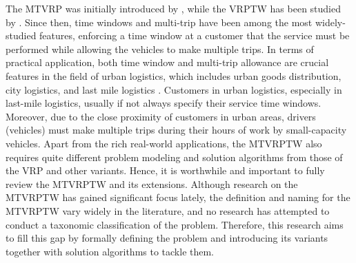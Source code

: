 The MTVRP was initially introduced by \cite{fleischmann1990vehicle}, while the VRPTW has been studied by \cite{kolen1987vehicle}. Since then, time windows and multi-trip have been among the most widely-studied features, enforcing a time window at a customer that the service must be performed while allowing the vehicles to make multiple trips.  In terms of practical application, both time window and multi-trip allowance are crucial features in the field of urban logistics, which includes urban goods distribution, city logistics, and last mile logistics \citep{cardenas2017city}.  Customers in urban logistics, especially in last-mile logistics, usually if not always specify their service time windows.  Moreover, due to the close proximity of customers in urban areas, drivers (vehicles) must make multiple trips during their hours of work by small-capacity vehicles.    Apart from the rich real-world applications, the MTVRPTW also requires quite different problem modeling and solution algorithms from those of the VRP and other variants.  Hence, it is worthwhile and important to fully review the MTVRPTW and its extensions.  Although research on the MTVRPTW has gained significant focus lately, the definition and naming for the MTVRPTW vary widely in the literature, and no research has attempted to conduct a taxonomic classification of the problem.  Therefore, this research aims to fill this gap by formally defining the problem and introducing its variants together with solution algorithms to tackle them.
\newline


